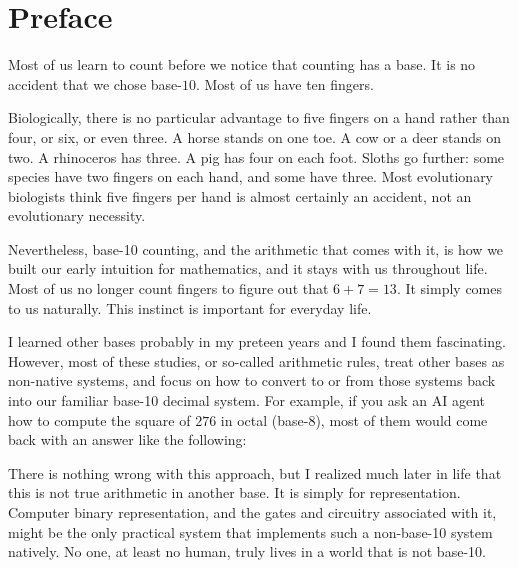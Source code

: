 \chapter{Preface}
\label{ch:preface}

Most of us learn to count before we notice that counting has a base. It is no accident that we chose base-$10$. Most of us have ten fingers.

Biologically, there is no particular advantage to five fingers on a hand rather than four, or six, or even three. A horse stands on one toe. A cow or a deer stands on two. A rhinoceros has three. A pig has four on each foot. Sloths go further: some species have two fingers on each hand, and some have three. Most evolutionary biologists think five fingers per hand is almost certainly an accident, not an evolutionary necessity.

Nevertheless, base-10 counting, and the arithmetic that comes with it, is how we built our early intuition for mathematics, and it stays with us throughout life. Most of us no longer count fingers to figure out that $6 + 7 = 13$. It simply comes to us naturally. This instinct is important for everyday life.

I learned other bases probably in my preteen years and I found them fascinating. However, most of these studies, or so-called arithmetic rules, treat other bases as non-native systems, and focus on how to convert to or from those systems back into our familiar base-10 decimal system. For example, if you ask an AI agent how to compute the square of $276$ in octal (base-8), most of them would come back with an answer like the following:

\vspace{1em}
\noindent
\begingroup
\setlength{\fboxsep}{8pt}
\endgroup
\par\vspace{1em}

There is nothing wrong with this approach, but I realized much later in life that this is not true arithmetic in another base. It is simply for representation. Computer binary representation, and the gates and circuitry associated with it, might be the only practical system that implements such a non-base-10 system natively. No one, at least no human, truly lives in a world that is not base-10.

